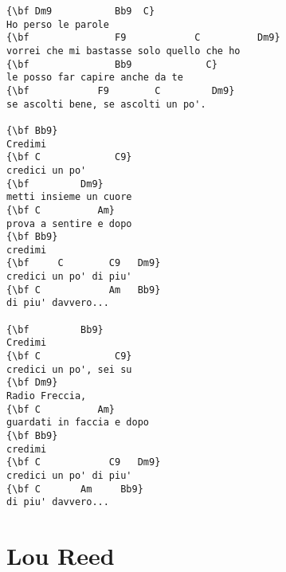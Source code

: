 \documentclass[a4paper]{article}
\begin{document}
\begin{multicols}{2}
\begin{Verbatim}[commandchars=\\\{\}]
{\bf Dm9           Bb9  C}
Ho perso le parole
{\bf               F9            C          Dm9}
vorrei che mi bastasse solo quello che ho
{\bf               Bb9             C}
le posso far capire anche da te
{\bf            F9        C         Dm9}
se ascolti bene, se ascolti un po'.

{\bf Bb9}
Credimi
{\bf C             C9}
credici un po'
{\bf         Dm9}
metti insieme un cuore
{\bf C          Am}
prova a sentire e dopo
{\bf Bb9}
credimi
{\bf     C        C9   Dm9}
credici un po' di piu'
{\bf C            Am   Bb9}
di piu' davvero...

{\bf         Bb9}
Credimi
{\bf C             C9}
credici un po', sei su
{\bf Dm9}
Radio Freccia,
{\bf C          Am}
guardati in faccia e dopo
{\bf Bb9}
credimi
{\bf C            C9   Dm9}
credici un po' di piu' 
{\bf C       Am     Bb9}
di piu' davvero...
\end{Verbatim}
\end{multicols}
\newpage
\section{Lou Reed} %
\label{sec:Lou Ree}
\end{document}
